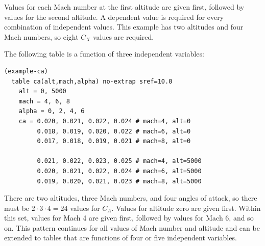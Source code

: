 Values for each Mach number at the first altitude are given first, followed by values
for the second altitude. A dependent value is required for every combination of
independent values. This example has two altitudes and four Mach numbers, so eight
$C_X$ values are required.

The following table is a function of three independent variables:

\begin{lstlisting}[style=taosmanual]
(example-ca)
  table ca(alt,mach,alpha) no-extrap sref=10.0
    alt = 0, 5000
    mach = 4, 6, 8
    alpha = 0, 2, 4, 6
    ca = 0.020, 0.021, 0.022, 0.024 # mach=4, alt=0
         0.018, 0.019, 0.020, 0.022 # mach=6, alt=0
         0.017, 0.018, 0.019, 0.021 # mach=8, alt=0

         0.021, 0.022, 0.023, 0.025 # mach=4, alt=5000
         0.020, 0.021, 0.022, 0.024 # mach=6, alt=5000
         0.019, 0.020, 0.021, 0.023 # mach=8, alt=5000
\end{lstlisting}

There are two altitudes, three Mach numbers, and four angles of attack, so there must
be $2\cdot3\cdot4=24$ values for $C_A$. Values for altitude zero are given first.
Within this set, values for Mach 4 are given first, followed by values for Mach 6, and
so on. This pattern continues for all values of Mach number and altitude and can be
extended to tables that are functions of four or five independent variables.
